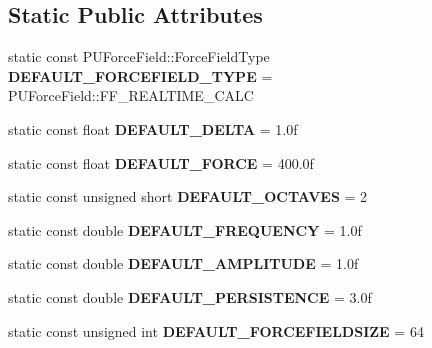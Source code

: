 \subsection*{Static Public Attributes}
\begin{DoxyCompactItemize}
\item 
\mbox{\label{classPUForceFieldAffector_ae275b198903e65c743c4add8112bc50e}} 
static const P\+U\+Force\+Field\+::\+Force\+Field\+Type {\bfseries D\+E\+F\+A\+U\+L\+T\+\_\+\+F\+O\+R\+C\+E\+F\+I\+E\+L\+D\+\_\+\+T\+Y\+PE} = P\+U\+Force\+Field\+::\+F\+F\+\_\+\+R\+E\+A\+L\+T\+I\+M\+E\+\_\+\+C\+A\+LC
\item 
\mbox{\label{classPUForceFieldAffector_a9f0befdd0aa355a39f10529c547819ea}} 
static const float {\bfseries D\+E\+F\+A\+U\+L\+T\+\_\+\+D\+E\+L\+TA} = 1.\+0f
\item 
\mbox{\label{classPUForceFieldAffector_aa078575e08764ac45d75c82439726927}} 
static const float {\bfseries D\+E\+F\+A\+U\+L\+T\+\_\+\+F\+O\+R\+CE} = 400.\+0f
\item 
\mbox{\label{classPUForceFieldAffector_abe2c1a5cf524b420b5c640ddffd1f599}} 
static const unsigned short {\bfseries D\+E\+F\+A\+U\+L\+T\+\_\+\+O\+C\+T\+A\+V\+ES} = 2
\item 
\mbox{\label{classPUForceFieldAffector_adb18e4c98a8ab04e1d7e37f1f6682fa9}} 
static const double {\bfseries D\+E\+F\+A\+U\+L\+T\+\_\+\+F\+R\+E\+Q\+U\+E\+N\+CY} = 1.\+0f
\item 
\mbox{\label{classPUForceFieldAffector_a4a20b4d446b8a10ef6ec1ecdf019bb07}} 
static const double {\bfseries D\+E\+F\+A\+U\+L\+T\+\_\+\+A\+M\+P\+L\+I\+T\+U\+DE} = 1.\+0f
\item 
\mbox{\label{classPUForceFieldAffector_aca2b345563ae2f8bdce0333733c2b409}} 
static const double {\bfseries D\+E\+F\+A\+U\+L\+T\+\_\+\+P\+E\+R\+S\+I\+S\+T\+E\+N\+CE} = 3.\+0f
\item 
\mbox{\label{classPUForceFieldAffector_ac3cd3befd19db0f48df28d7f26ad4f0d}} 
static const unsigned int {\bfseries D\+E\+F\+A\+U\+L\+T\+\_\+\+F\+O\+R\+C\+E\+F\+I\+E\+L\+D\+S\+I\+ZE} = 64

\end{DoxyCompactItemize}
